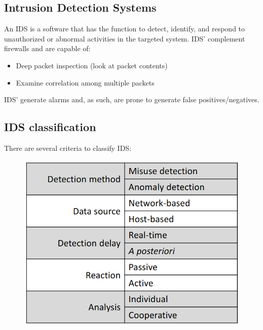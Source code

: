 \documentclass[10pt,a4paper]{report}
\begin{document}
\subsection{Intrusion Detection Systems}
An IDS is a software that has the function to detect, identify, and respond to unauthorized or abnormal activities in the targeted system. IDS' complement firewalls and are capable of:
\begin{itemize}
\item Deep packet inspection (look at packet contents)
\item Examine correlation among multiple packets
\end{itemize}
IDS' generate alarms and, as such, are prone to generate false positives/negatives.
\subsection{IDS classification}
There are several criteria to classify IDS:
\begin{figure}[H]
\centering
\includegraphics[scale=0.45]{19.png}
\end{figure}
\end{document}
